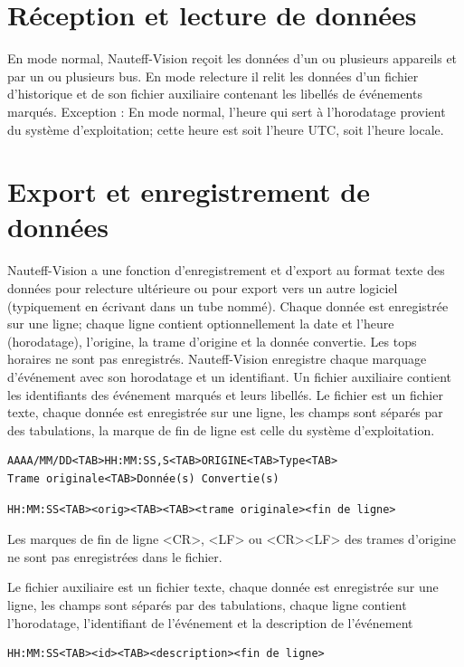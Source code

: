 \documentclass[a4paper,11pt]{report}
\begin{document}
\section{Réception et lecture de données}

En mode normal, Nauteff-Vision reçoit les données d'un ou plusieurs appareils et par un ou plusieurs bus.
En mode relecture il relit les données d'un fichier d'historique et de son fichier auxiliaire
contenant les libellés de événements marqués.
Exception : En mode normal, l'heure qui sert à l'horodatage provient du système d'exploitation;
cette heure est soit l'heure UTC, soit l'heure locale.

\section{Export et enregistrement de données}

Nauteff-Vision a une fonction d'enregistrement et d'export
au format texte des données pour relecture ultérieure 
ou pour export vers un autre logiciel
(typiquement en écrivant dans un tube nommé).
Chaque donnée est enregistrée sur une ligne;
chaque ligne contient optionnellement la date et l'heure (horodatage),
l'origine, la trame d'origine et la donnée convertie.
Les tops horaires ne sont pas enregistrés.
Nauteff-Vision enregistre chaque marquage d'événement avec son horodatage et un identifiant.
Un fichier auxiliaire contient les identifiants des événement
marqués et leurs libellés.
Le fichier est un fichier texte, chaque donnée est enregistrée sur une ligne,
les champs sont séparés par des tabulations,
la marque de fin de ligne est celle du système d'exploitation.

\begin{verbatim}
AAAA/MM/DD<TAB>HH:MM:SS,S<TAB>ORIGINE<TAB>Type<TAB>
Trame originale<TAB>Donnée(s) Convertie(s)
\end{verbatim}


\begin{verbatim}
HH:MM:SS<TAB><orig><TAB><TAB><trame originale><fin de ligne>
\end{verbatim}
Les marques de fin de ligne <CR>, <LF> ou <CR><LF> des trames d'origine ne sont pas enregistrées dans le fichier.


Le fichier auxiliaire est un fichier texte, chaque donnée est enregistrée sur une ligne,
les champs sont séparés par des tabulations, chaque ligne contient l'horodatage, l'identifiant de l'événement et la description de l'événement

\begin{verbatim}
HH:MM:SS<TAB><id><TAB><description><fin de ligne>
\end{verbatim}
\end{document}
